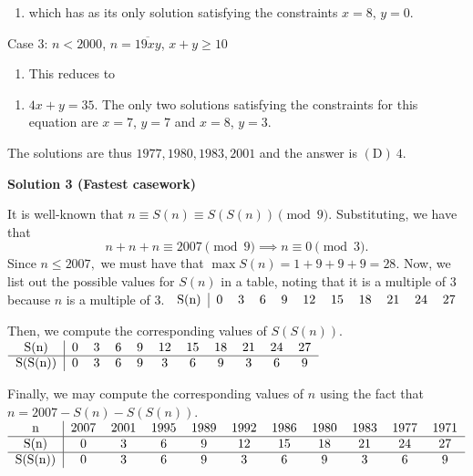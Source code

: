 \begin{enumerate}
 
            \begin{enumerate}[label=(\roman*)]
                \item which has as its only solution satisfying the constraints $x = 8$, $y = 0$.
            \end{enumerate}
            Case 3: $n < 2000$, $n = \overline{19xy}$, $x + y \geq 10$

 
            \begin{enumerate}[label=(\roman*)]
                \item This reduces to
            \end{enumerate}
            
            \begin{enumerate}[label=(\roman*)]
                \item $4x + y = 35$. The only two solutions satisfying the constraints for this equation are $x = 7$, $y = 7$ and $x = 8$, $y = 3$.
            \end{enumerate}
            The solutions are thus $1977, 1980, 1983, 2001$ and the answer is $\mathrm{(D)}\  4$.

 



\textbf{Solution 3 (Fastest casework)}

It is well-known that $n \equiv S(n)\equiv S(S(n)) \pmod{9}.$ Substituting, we have that 
 \[n+n+n \equiv 2007 \pmod{9} \implies n \equiv 0 \pmod{3}.\] Since $n \leq 2007,$ we must have that $\max S(n)=1+9+9+9=28.$ Now, we list out the possible values for $S(n)$ in a table, noting that it is a multiple of $3$ because $n$ is a multiple of $3.$
$\begin{tabular}{c|c c c c c c c c c c}   S(n) & 0 & 3 & 6 & 9 & 12 & 15 & 18 & 21 & 24 & 27 \\ \end{tabular}$

 

 Then, we compute the corresponding values of $S(S(n)).$
$\begin{tabular}{c|c c c c c c c c c c}   S(n) & 0 & 3 & 6 & 9 & 12 & 15 & 18 & 21 & 24 & 27 \\ \hline S(S(n)) & 0 & 3 & 6 & 9 & 3 & 6 & 9 & 3 & 6 & 9 \\ \end{tabular}$

 

 Finally, we may compute the corresponding values of $n$ using the fact that $n=2007-S(n)-S(S(n)).$
$\begin{tabular}{c|c c c c c c c c c c}  n & 2007 & 2001 & 1995 & 1989 & 1992 & 1986 & 1980 & 1983 & 1977 & 1971 \\ \hline S(n) & 0 & 3 & 6 & 9 & 12 & 15 & 18 & 21 & 24 & 27 \\ \hline S(S(n)) & 0 & 3 & 6 & 9 & 3 & 6 & 9 & 3 & 6 & 9 \\ \end{tabular}$


\end{enumerate}
